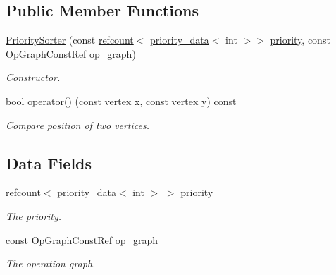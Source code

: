 \subsection*{Public Member Functions}
\begin{DoxyCompactItemize}
\item 
\hyperlink{structPrioritySorter_ae8a474996b713df838539521af5a097f}{Priority\+Sorter} (const \hyperlink{structrefcount}{refcount}$<$ \hyperlink{structpriority__data}{priority\+\_\+data}$<$ int $>$$>$ \hyperlink{structPrioritySorter_a3e7f7e453d137c12b90d718b3e558d90}{priority}, const \hyperlink{op__graph_8hpp_a9a0b240622c47584bee6951a6f5de746}{Op\+Graph\+Const\+Ref} \hyperlink{structPrioritySorter_a36ee4d644e6934e3d0a41e7c568c30a0}{op\+\_\+graph})
\begin{DoxyCompactList}\small\item\em Constructor. \end{DoxyCompactList}\item 
bool \hyperlink{structPrioritySorter_ad91c06049bceb95e02312fb3ad37f7db}{operator()} (const \hyperlink{graph_8hpp_abefdcf0544e601805af44eca032cca14}{vertex} x, const \hyperlink{graph_8hpp_abefdcf0544e601805af44eca032cca14}{vertex} y) const
\begin{DoxyCompactList}\small\item\em Compare position of two vertices. \end{DoxyCompactList}\end{DoxyCompactItemize}
\subsection*{Data Fields}
\begin{DoxyCompactItemize}
\item 
\hyperlink{structrefcount}{refcount}$<$ \hyperlink{structpriority__data}{priority\+\_\+data}$<$ int $>$ $>$ \hyperlink{structPrioritySorter_a3e7f7e453d137c12b90d718b3e558d90}{priority}
\begin{DoxyCompactList}\small\item\em The priority. \end{DoxyCompactList}\item 
const \hyperlink{op__graph_8hpp_a9a0b240622c47584bee6951a6f5de746}{Op\+Graph\+Const\+Ref} \hyperlink{structPrioritySorter_a36ee4d644e6934e3d0a41e7c568c30a0}{op\+\_\+graph}
\begin{DoxyCompactList}\small\item\em The operation graph. \end{DoxyCompactList}\end{DoxyCompactItemize}


